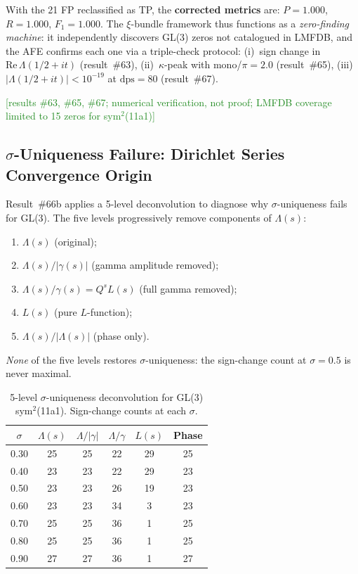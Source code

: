 \documentclass[11pt, a4paper]{article}
\theoremstyle{definition}
\theoremstyle{plain}
\begin{document}
With the 21 FP reclassified as TP, the \textbf{corrected metrics} are:
$P = 1.000$, $R = 1.000$, $F_1 = 1.000$.  The $\xi$-bundle framework thus
functions as a \emph{zero-finding machine}: it independently discovers
GL(3) zeros not catalogued in LMFDB, and the AFE confirms each one via a
triple-check protocol:
(i)~sign change in $\mathrm{Re}\,\Lambda(1/2+it)$ (result~\#63),
(ii)~$\kappa$-peak with mono/$\pi = 2.0$ (result~\#65),
(iii)~$|\Lambda(1/2+it)| < 10^{-19}$ at $\mathrm{dps} = 80$ (result~\#67).

\textcolor{ForestGreen}{[results \#63, \#65, \#67; numerical verification,
not proof; LMFDB coverage limited to 15 zeros for sym$^2$(11a1)]}

\subsection{$\sigma$-Uniqueness Failure: Dirichlet Series Convergence Origin}
\label{subsec:gl3_sigma}

Result~\#66b applies a 5-level deconvolution to diagnose why
$\sigma$-uniqueness fails for GL(3).  The five levels progressively remove
components of $\Lambda(s)$:
\begin{enumerate}
  \item $\Lambda(s)$ (original);
  \item $\Lambda(s)/|\gamma(s)|$ (gamma amplitude removed);
  \item $\Lambda(s)/\gamma(s) = Q^s L(s)$ (full gamma removed);
  \item $L(s)$ (pure $L$-function);
  \item $\Lambda(s)/|\Lambda(s)|$ (phase only).
\end{enumerate}
\emph{None} of the five levels restores $\sigma$-uniqueness: the sign-change
count at $\sigma = 0.5$ is never maximal.

\begin{table}[ht]
\centering
\caption{5-level $\sigma$-uniqueness deconvolution for GL(3) sym$^2$(11a1).
         Sign-change counts at each $\sigma$.\label{tab:gl3_sigma}}
\smallskip
\begin{tabular}{cccccc}
\toprule
$\sigma$ & $\Lambda(s)$ & $\Lambda/|\gamma|$ & $\Lambda/\gamma$ & $L(s)$ & Phase \\
\midrule
0.30 & 25 & 25 & 22 & 29 & 25 \\
0.40 & 23 & 23 & 22 & 29 & 23 \\
0.50 & 23 & 23 & 26 & 19 & 23 \\
0.60 & 23 & 23 & 34 &  3 & 23 \\
0.70 & 25 & 25 & 36 &  1 & 25 \\
0.80 & 25 & 25 & 36 &  1 & 25 \\
0.90 & 27 & 27 & 36 &  1 & 27 \\
\bottomrule
\end{tabular}
\end{table}
\end{document}
